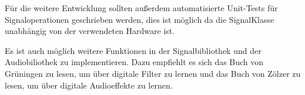 Für die weitere Entwicklung sollten außerdem automatisierte Unit-Tests für
Signaloperationen geschrieben werden, dies ist möglich da die SignalKlasse
unabhängig von der verwendeten Hardware ist.

Es ist auch möglich weitere Funktionen in der Signalbibliothek und der 
Audiobiliothek zu implementieren. Dazu empfiehlt es sich das Buch
von Grüningen \cite{grueningen2008dsv} zu lesen, um über digitale Filter zu 
lernen und das Buch von Zölzer \cite{DAFX} zu lesen, um über digitale Audioeffekte zu 
lernen.